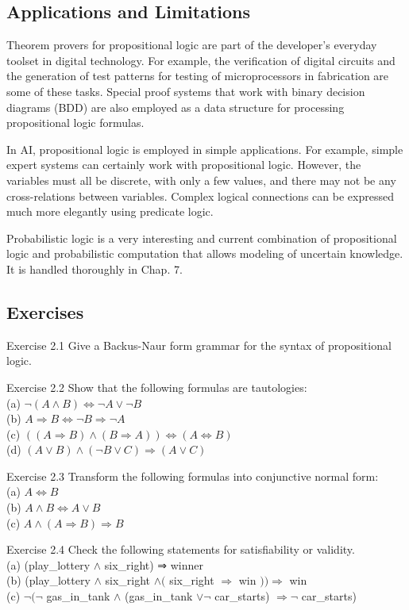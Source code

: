 \documentclass[10pt]{article}
\begin{document}
\subsection*{Applications and Limitations}
Theorem provers for propositional logic are part of the developer's everyday toolset in digital technology. For example, the verification of digital circuits and the generation of test patterns for testing of microprocessors in fabrication are some of these tasks. Special proof systems that work with binary decision diagrams (BDD) are also employed as a data structure for processing propositional logic formulas.

In AI, propositional logic is employed in simple applications. For example, simple expert systems can certainly work with propositional logic. However, the variables must all be discrete, with only a few values, and there may not be any cross-relations between variables. Complex logical connections can be expressed much more elegantly using predicate logic.

Probabilistic logic is a very interesting and current combination of propositional logic and probabilistic computation that allows modeling of uncertain knowledge. It is handled thoroughly in Chap. 7.

\subsection*{Exercises}
Exercise 2.1 Give a Backus-Naur form grammar for the syntax of propositional logic.

Exercise 2.2 Show that the following formulas are tautologies:\\
(a) $\neg(A \wedge B) \Leftrightarrow \neg A \vee \neg B$\\
(b) $A \Rightarrow B \Leftrightarrow \neg B \Rightarrow \neg A$\\
(c) $((A \Rightarrow B) \wedge(B \Rightarrow A)) \Leftrightarrow(A \Leftrightarrow B)$\\
(d) $(A \vee B) \wedge(\neg B \vee C) \Rightarrow(A \vee C)$

Exercise 2.3 Transform the following formulas into conjunctive normal form:\\
(a) $A \Leftrightarrow B$\\
(b) $A \wedge B \Leftrightarrow A \vee B$\\
(c) $A \wedge(A \Rightarrow B) \Rightarrow B$

Exercise 2.4 Check the following statements for satisfiability or validity.\\
(a) (play\_lottery $\wedge$ six\_right) ⇒ winner\\
(b) (play\_lottery $\wedge$ six\_right $\wedge($ six\_right $\Rightarrow$ win $)) \Rightarrow$ win\\
(c) $\neg(\neg$ gas\_in\_tank $\wedge$ (gas\_in\_tank $\vee \neg$ car\_starts) $\Rightarrow \neg$ car\_starts)
\end{document}
